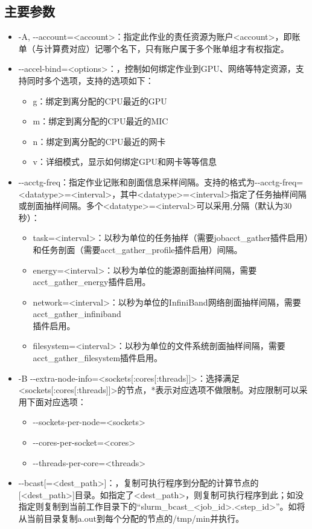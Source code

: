 \subsection{主要参数}\label{slurmoption}
\begin{itemize}
	\item -A, -{}-account=<account>：指定此作业的责任资源为账户<account>，即账单（与计算费对应）记哪个名下，只有账户属于多个账单组才有权指定。
	\item -{}-accel-bind=<options>：，控制如何绑定作业到GPU、网络等特定资源，支持同时多个选项，支持的选项如下：
	\begin{itemize}
		\item g：绑定到离分配的CPU最近的GPU
		\item m：绑定到离分配的CPU最近的MIC
		\item n：绑定到离分配的CPU最近的网卡
		\item v：详细模式，显示如何绑定GPU和网卡等等信息
	\end{itemize}
    \item -{}-acctg-freq：指定作业记账和剖面信息采样间隔。支持的格式为-{}-acctg-freq=<datatype>=<interval>，其中<datatype>=<interval>指定了任务抽样间隔或剖面抽样间隔。多个<datatype>=<interval>可以采用,分隔（默认为30秒）：
	\begin{itemize}
		\item task=<interval>：以秒为单位的任务抽样（需要jobacct\_gather插件启用）和任务剖面（需要acct\_gather\_profile插件启用）间隔。
		\item energy=<interval>：以秒为单位的能源剖面抽样间隔，需要acct\_gather\_energy插件启用。
		\item network=<interval>：以秒为单位的InfiniBand网络剖面抽样间隔，需要acct\_gather\_infiniband\\插件启用。
		\item filesystem=<interval>：以秒为单位的文件系统剖面抽样间隔，需要acct\_gather\_filesystem插件启用。
	\end{itemize}
    \item -B -{}-extra-node-info=<sockets[:cores[:threads]]>：选择满足<sockets[:cores[:threads]]>的节点，*表示对应选项不做限制。对应限制可以采用下面对应选项：
	\begin{itemize}
		\item -{}-sockets-per-node=<sockets>
		\item -{}-cores-per-socket=<cores>
		\item -{}-threads-per-core=<threads>
	\end{itemize}
	\item -{}-bcast[=<dest\_path>]：，复制可执行程序到分配的计算节点的[<dest\_path>]目录。如指定了<dest\_path>，则复制可执行程序到此；如没指定则复制到当前工作目录下的``slurm\_bcast\_<job\_id>.<step\_id>''。如将从当前目录复制a.out到每个分配的节点的/tmp/min并执行。

\end{itemize}
